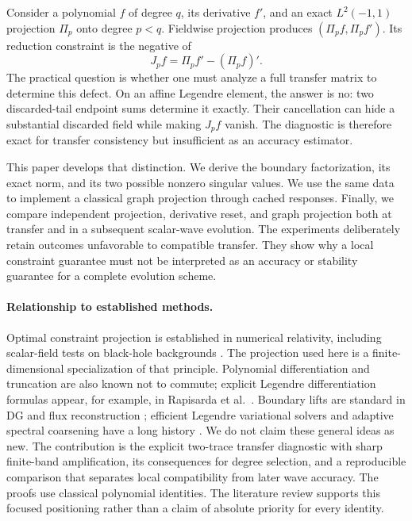 \documentclass[11pt]{article}
\newcommand{\proj}{\Pi_p}
\begin{document}
Consider a polynomial \(f\) of degree \(q\), its derivative \(f'\), and an exact \(L^2(-1,1)\) projection \(\proj\) onto degree \(p<q\). Fieldwise projection produces \((\proj f,\proj f')\). Its reduction constraint is the negative of
\begin{equation}\label{eq:commutator}
 J_p f=\proj f'-(\proj f)'.
\end{equation}
The practical question is whether one must analyze a full transfer matrix to determine this defect. On an affine Legendre element, the answer is no: two discarded-tail endpoint sums determine it exactly. Their cancellation can hide a substantial discarded field while making \(J_pf\) vanish. The diagnostic is therefore exact for transfer consistency but insufficient as an accuracy estimator.

This paper develops that distinction. We derive the boundary factorization, its exact norm, and its two possible nonzero singular values. We use the same data to implement a classical graph projection through cached responses. Finally, we compare independent projection, derivative reset, and graph projection both at transfer and in a subsequent scalar-wave evolution. The experiments deliberately retain outcomes unfavorable to compatible transfer. They show why a local constraint guarantee must not be interpreted as an accuracy or stability guarantee for a complete evolution scheme.

\paragraph{Relationship to established methods.}
Optimal constraint projection is established in numerical relativity, including scalar-field tests on black-hole backgrounds \cite{holst}. The projection used here is a finite-dimensional specialization of that principle. Polynomial differentiation and truncation are also known not to commute; explicit Legendre differentiation formulas appear, for example, in Rapisarda et al.\ \cite{rapisarda}. Boundary lifts are standard in DG and flux reconstruction \cite{huynh}; efficient Legendre variational solvers and adaptive spectral coarsening have a long history \cite{shen,canuto}. We do not claim these general ideas as new. The contribution is the explicit two-trace transfer diagnostic with sharp finite-band amplification, its consequences for degree selection, and a reproducible comparison that separates local compatibility from later wave accuracy. The proofs use classical polynomial identities. The literature review supports this focused positioning rather than a claim of absolute priority for every identity.
\end{document}
